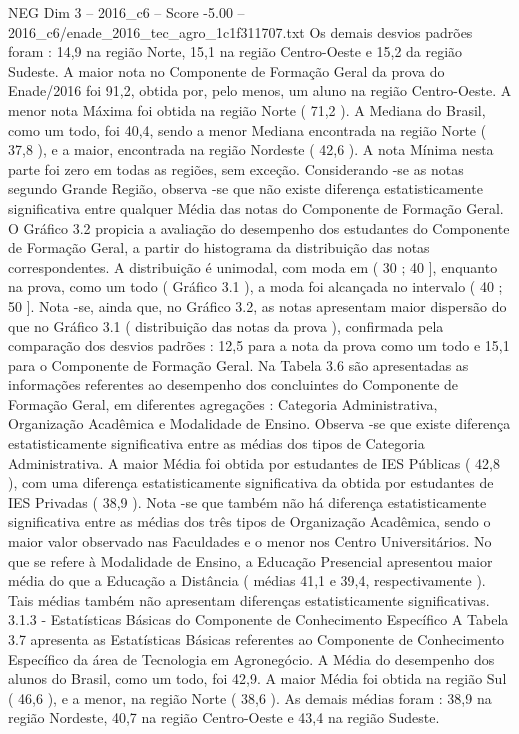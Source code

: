 \begin{textsample}{NEG Dim 3 – 2016\_c6 – Score -5.00 – 2016\_c6/enade\_2016\_tec\_agro\_1c1f311707.txt}
Os demais desvios padrões foram : 14,9 na região Norte, 15,1 na região Centro-Oeste e 15,2 da região Sudeste.
A maior nota no Componente de Formação Geral da prova do Enade/2016 foi 91,2, obtida por, pelo menos, um aluno na região Centro-Oeste.
A menor nota Máxima foi obtida na região Norte ( 71,2 ).
A Mediana do Brasil, como um todo, foi 40,4, sendo a menor Mediana encontrada na região Norte ( 37,8 ), e a maior, encontrada na região Nordeste ( 42,6 ).
A nota Mínima nesta parte foi zero em todas as regiões, sem exceção.
Considerando -se as notas segundo Grande Região, observa -se que não existe diferença estatisticamente significativa entre qualquer Média das notas do Componente de Formação Geral.
O Gráfico 3.2 propicia a avaliação do desempenho dos estudantes do Componente de Formação Geral, a partir do histograma da distribuição das notas correspondentes.
A distribuição é unimodal, com moda em ( 30 ; 40 ], enquanto na prova, como um todo ( Gráfico 3.1 ), a moda foi alcançada no intervalo ( 40 ; 50 ].
Nota -se, ainda que, no Gráfico 3.2, as notas apresentam maior dispersão do que no Gráfico 3.1 ( distribuição das notas da prova ), confirmada pela comparação dos desvios padrões : 12,5 para a nota da prova como um todo e 15,1 para o Componente de Formação Geral.
Na Tabela 3.6 são apresentadas as informações referentes ao desempenho dos concluintes do Componente de Formação Geral, em diferentes agregações : Categoria Administrativa, Organização Acadêmica e Modalidade de Ensino.
Observa -se que existe diferença estatisticamente significativa entre as médias dos tipos de Categoria Administrativa.
A maior Média foi obtida por estudantes de IES Públicas ( 42,8 ), com uma diferença estatisticamente significativa da obtida por estudantes de IES Privadas ( 38,9 ).
Nota -se que também não há diferença estatisticamente significativa entre as médias dos três tipos de Organização Acadêmica, sendo o maior valor observado nas Faculdades e o menor nos Centro Universitários.
No que se refere à Modalidade de Ensino, a Educação Presencial apresentou maior média do que a Educação a Distância ( médias 41,1 e 39,4, respectivamente ).
Tais médias também não apresentam diferenças estatisticamente significativas. 3.1.3 - Estatísticas Básicas do Componente de Conhecimento Específico A Tabela 3.7 apresenta as Estatísticas Básicas referentes ao Componente de Conhecimento Específico da área de Tecnologia em Agronegócio.
A Média do desempenho dos alunos do Brasil, como um todo, foi 42,9.
A maior Média foi obtida na região Sul ( 46,6 ), e a menor, na região Norte ( 38,6 ).
As demais médias foram : 38,9 na região Nordeste, 40,7 na região Centro-Oeste e 43,4 na região Sudeste.

\end{textsample}
